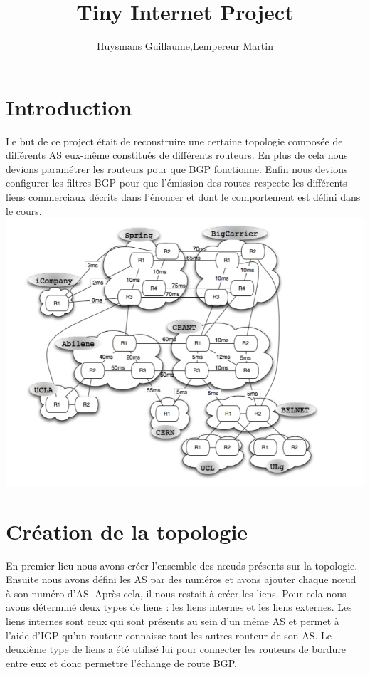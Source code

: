 \documentclass[10pt,a4paper,twocolumn]{article}
\title{Tiny Internet Project}
\author{Huysmans Guillaume,Lempereur Martin}
\begin{document}
\maketitle
\section{Introduction}
Le but de ce project était de reconstruire une certaine topologie composée de différents AS eux-même constitués de différents routeurs. En plus de cela nous devions paramétrer les routeurs pour que BGP fonctionne. Enfin nous devions configurer les filtres BGP pour que l'émission des routes respecte les différents liens commerciaux décrits dans l'énoncer et dont le comportement est défini dans le cours.
\includegraphics[scale=0.3]{topo.png}

\section{Création de la topologie}
En premier lieu nous avons créer l'ensemble des nœuds présents sur la topologie. Ensuite nous avons défini les AS par des numéros et avons ajouter chaque nœud à son numéro d'AS.
Après cela, il nous restait à créer les liens. Pour cela nous avons déterminé deux types de liens : les liens internes et les liens externes.
Les liens internes sont ceux qui sont présents au sein d'un même AS et permet à l'aide d'IGP qu'un routeur connaisse tout les autres routeur de son AS. Le deuxième type de liens a été utilisé lui pour connecter les routeurs de bordure entre eux et donc permettre l'échange de route BGP.
\end{document}

